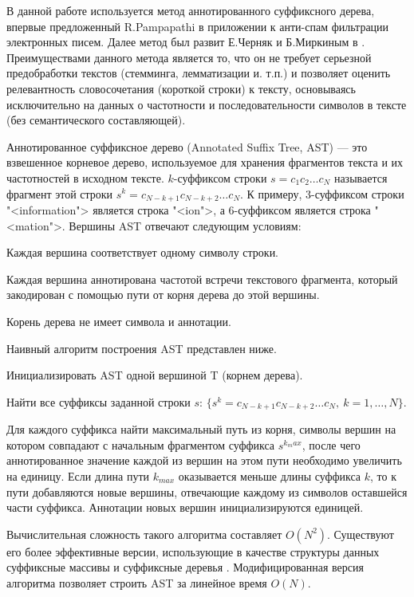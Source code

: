 \documentclass[12pt]{article}
\newenvironment{itemize*}%
{\begin{itemize}%
	\setlength{\itemsep}{0pt}%
	\setlength{\parskip}{0pt}}%
{\end{itemize}}
\newenvironment{enumerate*}%
{\begin{enumerate}%
	\setlength{\itemsep}{0pt}%
	\setlength{\parskip}{0pt}}%
{\end{enumerate}}
\begin{document}
В данной работе используется метод аннотированного суффиксного дерева, впервые предложенный R.Pampapathi \cite{Pampapathi_2006} в приложении к анти-спам фильтрации электронных писем. Далее метод был развит Е.Черняк и Б.Миркиным в \cite{Chernyak_2015, Chernyak_Mirkin_2015}. Преимуществами данного метода является то, что он не требует серьезной предобработки текстов (стемминга, лемматизации и. т.п.) и позволяет оценить релевантность словосочетания (короткой строки) к тексту, основываясь исключительно на данных о частотности и последовательности символов в тексте (без семантического составляющей).

Аннотированное суффиксное дерево (Annotated Suffix Tree, AST) --- это взвешенное корневое дерево, используемое для хранения фрагментов текста и их частотностей в исходном тексте. $k$-суффиксом строки $s=c_1c_2\ldots c_N$ называется фрагмент этой строки $s^k=c_{N-k+1}c_{N-k+2}\ldots c_{N}$. К примеру, 3-суффиксом строки "<information"> является строка "<ion">, а 6-суффиксом является строка "<mation">. Вершины AST отвечают следующим условиям:
\begin{itemize*}
	\item Каждая вершина соответствует одному символу строки.
	\item Каждая вершина аннотирована частотой встречи текстового фрагмента, который закодирован с помощью пути от корня дерева до этой вершины.
	\item Корень дерева не имеет символа и аннотации.
\end{itemize*}

Наивный алгоритм построения AST представлен ниже.

\begin{enumerate*}
	\item Инициализировать AST одной вершиной T (корнем дерева).
	\item Найти все суффиксы заданной строки $s$: $\{s^k=c_{N-k+1}c_{N-k+2}\ldots c_{N}, \ k=1,\ldots, N\}$.
	\item Для каждого суффикса найти максимальный путь из корня, символы вершин на котором совпадают с начальным фрагментом суффикса $s^{k_max}$, после чего аннотированное значение каждой из вершин на этом пути необходимо увеличить на единицу. Если длина пути $k_{max}$ оказывается меньше длины суффикса $k$, то к пути добавляются новые вершины, отвечающие каждому из символов оставшейся части суффикса. Аннотации новых вершин инициализируются единицей.
\end{enumerate*}
Вычислительная сложность такого алгоритма составляет $O(N^2)$. Существуют его более эффективные версии, использующие в качестве структуры данных суффиксные массивы и суффиксные деревья \cite{Grossi_2005}. Модифицированная версия алгоритма позволяет строить AST за линейное время $O(N)$.
\end{document}
